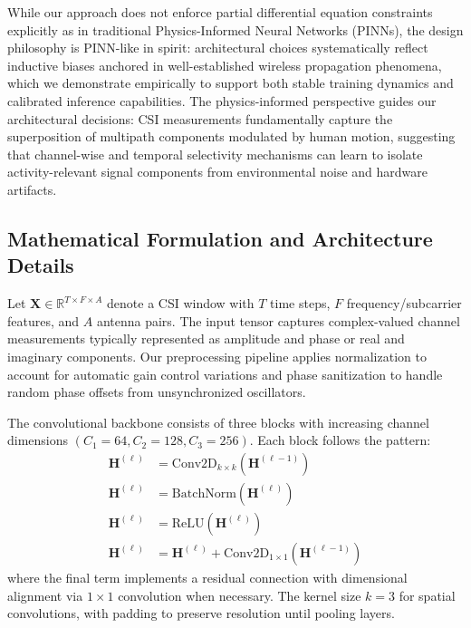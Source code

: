 \documentclass[journal]{IEEEtran}
\begin{document}
While our approach does not enforce partial differential equation constraints explicitly as in traditional Physics-Informed Neural Networks (PINNs), the design philosophy is PINN-like in spirit: architectural choices systematically reflect inductive biases anchored in well-established wireless propagation phenomena, which we demonstrate empirically to support both stable training dynamics and calibrated inference capabilities. The physics-informed perspective guides our architectural decisions: CSI measurements fundamentally capture the superposition of multipath components modulated by human motion, suggesting that channel-wise and temporal selectivity mechanisms can learn to isolate activity-relevant signal components from environmental noise and hardware artifacts.

\subsection{Mathematical Formulation and Architecture Details}

Let $\mathbf{X}\in \mathbb{R}^{T\times F\times A}$ denote a CSI window with $T$ time steps, $F$ frequency/subcarrier features, and $A$ antenna pairs. The input tensor captures complex-valued channel measurements typically represented as amplitude and phase or real and imaginary components. Our preprocessing pipeline applies normalization to account for automatic gain control variations and phase sanitization to handle random phase offsets from unsynchronized oscillators.

The convolutional backbone consists of three blocks with increasing channel dimensions $(C_1{=}64, C_2{=}128, C_3{=}256)$. Each block follows the pattern:
\begin{align}
\mathbf{H}^{(\ell)} &= \mathrm{Conv2D}_{k\times k}(\mathbf{H}^{(\ell-1)}) \\
\mathbf{H}^{(\ell)} &= \mathrm{BatchNorm}(\mathbf{H}^{(\ell)}) \\
\mathbf{H}^{(\ell)} &= \mathrm{ReLU}(\mathbf{H}^{(\ell)}) \\
\mathbf{H}^{(\ell)} &= \mathbf{H}^{(\ell)} + \mathrm{Conv2D}_{1\times 1}(\mathbf{H}^{(\ell-1)})
\end{align}
where the final term implements a residual connection with dimensional alignment via $1{\times}1$ convolution when necessary. The kernel size $k{=}3$ for spatial convolutions, with padding to preserve resolution until pooling layers.
\end{document}
